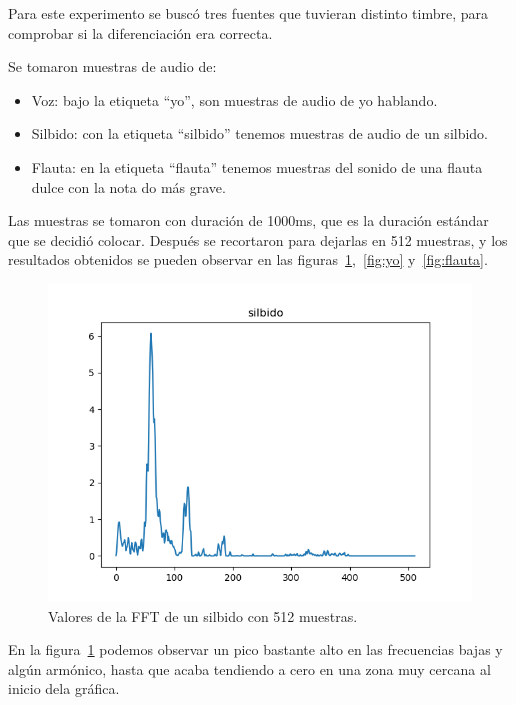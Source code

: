 \documentclass[a4paper, 12pt]{book}
\begin{document}
Para este experimento se buscó tres fuentes que tuvieran distinto timbre, para comprobar si la diferenciación era correcta.

Se tomaron muestras de audio de:
\begin{itemize}
	\item Voz: bajo la etiqueta ``yo'', son muestras de audio de yo hablando.
	\item Silbido: con la etiqueta ``silbido'' tenemos muestras de audio de un silbido.
	\item Flauta: en la etiqueta ``flauta'' tenemos muestras del sonido de una flauta dulce con la nota do más grave.
\end{itemize}

Las muestras se tomaron con duración de 1000ms, que es la duración estándar que se decidió colocar. Después se recortaron para dejarlas en 512 muestras, y los resultados obtenidos se pueden observar en las figuras~\ref{fig:silbido},~\ref{fig:yo} y~\ref{fig:flauta}.


\begin{figure}
	\centering
	\includegraphics[width=12cm, keepaspectratio]{img/silbido512.png}
	\caption{Valores de la FFT de un silbido con 512 muestras.}\label{fig:silbido}
\end{figure}

En la figura~\ref{fig:silbido} podemos observar un pico bastante alto en las frecuencias bajas y algún armónico, hasta que acaba tendiendo a cero en una zona muy cercana al inicio dela gráfica.
\end{document}
